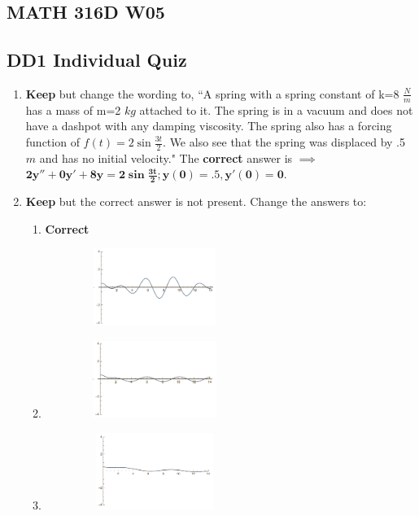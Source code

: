 \documentclass[11pt]{article}
\begin{document}
	
\begin{center}\section*{MATH 316D W05}\end{center}
\subsection*{DD1 Individual Quiz}

\begin{enumerate}
	\item \textbf{Keep} but change the wording to, ``A spring with a spring constant of k=8 $\frac{N}{m}$  has a mass of m=2 $kg$ attached to it. The spring is in a vacuum and does not have a dashpot with any damping viscosity. The spring also has a forcing function of $f(t)=2\sin{\frac{3t}{2}}$.  We also see that the spring was displaced by .5 $m$ and has no initial velocity." The \textbf{correct} answer is $\implies$ $\mathbf{2y''+0y'+8y=2\sin{\frac{3t}{2}}; y(0)=.5,y'(0)=0}$.
	\item \textbf{Keep} but the correct answer is not present. Change the answers to:
		\begin{enumerate}
			\item \textbf{Correct}  \begin{figure}[h!]
	\raggedright
		\graphicspath{{/Users/tylertrogden/Desktop/}}
		\includegraphics[height=2.5cm,width=5cm]{W05_DD1_Q2-1} 
\end{figure}

			\item {} \begin{figure}[h!]
	\raggedright
		\graphicspath{{/Users/tylertrogden/Desktop/}}
		\includegraphics[height=2.5cm,width=5cm]{W05_DD1_Q2-2} 
\end{figure}

			\item {} \begin{figure}[h!]
	\raggedright
		\graphicspath{{/Users/tylertrogden/Desktop/}}
		\includegraphics[height=2.5cm,width=5cm]{W05_DD1_Q2-3} 
\end{figure}


\end{enumerate}
\end{enumerate}
\end{document}
